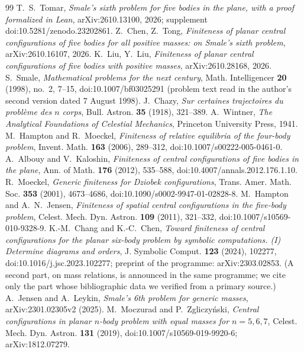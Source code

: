 \documentclass[11pt]{article}
\theoremstyle{definition}
\theoremstyle{remark}
\begin{document}
\begin{thebibliography}{99}
 T.~S.~Tomar, \emph{Smale's sixth problem for five bodies in the plane, with a proof
formalized in Lean}, arXiv:2610.13100, 2026; supplement doi:10.5281/zenodo.23202861.
 Z.~Chen, Z.~Tong, \emph{Finiteness of planar central configurations of five bodies
for all positive masses: on Smale's sixth problem}, arXiv:2610.16107, 2026.
 K.~Liu, Y.~Liu, \emph{Finiteness of planar central configurations of five bodies
with positive masses}, arXiv:2610.28168, 2026.
 S.~Smale, \emph{Mathematical problems for the next century},
Math. Intelligencer \textbf{20} (1998), no.~2, 7--15, doi:10.1007/bf03025291 (problem text read in the author's second
version dated 7 August 1998).
 J.~Chazy, \emph{Sur certaines trajectoires du probl\`eme des
$n$ corps}, Bull. Astron. \textbf{35} (1918), 321--389.
 A.~Wintner, \emph{The Analytical Foundations of Celestial
Mechanics}, Princeton University Press, 1941.
 M.~Hampton and R.~Moeckel, \emph{Finiteness of relative
equilibria of the four-body problem}, Invent. Math. \textbf{163} (2006),
289--312, doi:10.1007/s00222-005-0461-0.
 A.~Albouy and V.~Kaloshin, \emph{Finiteness of central
configurations of five bodies in the plane}, Ann. of Math. \textbf{176}
(2012), 535--588, doi:10.4007/annals.2012.176.1.10.
 R.~Moeckel, \emph{Generic finiteness for Dziobek
configurations}, Trans. Amer. Math. Soc. \textbf{353} (2001), 4673--4686, doi:10.1090/s0002-9947-01-02828-8.
 M.~Hampton and A.~N.~Jensen, \emph{Finiteness of spatial
central configurations in the five-body problem}, Celest. Mech. Dyn. Astron.
\textbf{109} (2011), 321--332, doi:10.1007/s10569-010-9328-9.
 K.-M.~Chang and K.-C.~Chen, \emph{Toward finiteness of
central configurations for the planar six-body problem by symbolic
computations. (I) Determine diagrams and orders}, J. Symbolic Comput.
\textbf{123} (2024), 102277, doi:10.1016/j.jsc.2023.102277; preprint of the programme: arXiv:2303.02853. (A
second part, on mass relations, is announced in the same programme; we cite
only the part whose bibliographic data we verified from a primary source.)
 A.~Jensen and A.~Leykin, \emph{Smale's 6th problem for generic
masses}, arXiv:2301.02305v2 (2025).
 M.~Moczurad and P.~Zgliczy\'nski, \emph{Central configurations
in planar $n$-body problem with equal masses for $n=5,6,7$}, Celest. Mech.
Dyn. Astron. \textbf{131} (2019), doi:10.1007/s10569-019-9920-6; arXiv:1812.07279.

\end{thebibliography}
\end{document}
